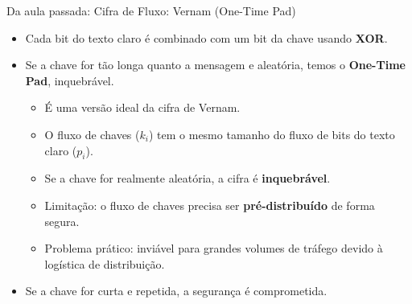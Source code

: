 \begin{frame}{Da aula passada: Cifra de Fluxo: Vernam (One-Time Pad)}

    \begin{itemize}
        \item Cada bit do texto claro é combinado com um bit da chave usando \textbf{XOR}.
        \item Se a chave for tão longa quanto a mensagem e aleatória, temos o \textbf{One-Time Pad}, inquebrável.

              \begin{itemize}
                  \item É uma versão ideal da cifra de Vernam.
                  \item O fluxo de chaves ($k_i$) tem o mesmo tamanho do fluxo de bits do texto claro ($p_i$).
                  \item Se a chave for realmente aleatória, a cifra é \textbf{inquebrável}.
                  \item Limitação: o fluxo de chaves precisa ser \textbf{pré-distribuído} de forma segura.
                  \item Problema prático: inviável para grandes volumes de tráfego devido à logística de distribuição.
              \end{itemize}


        \item Se a chave for curta e repetida, a segurança é comprometida.
    \end{itemize}




\end{frame}




